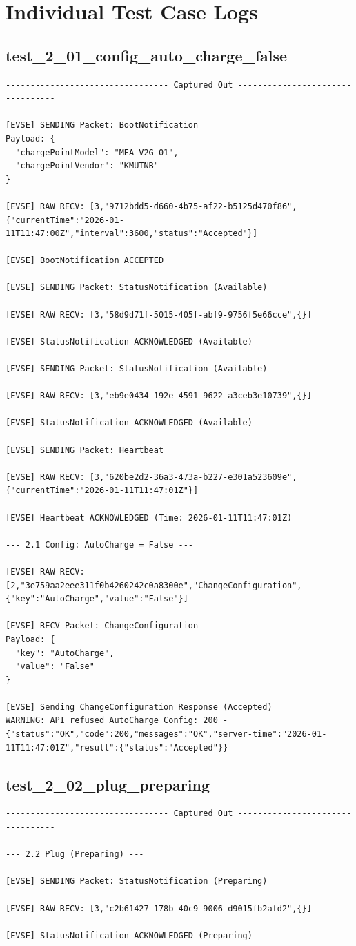 \documentclass{article}
\begin{document}
\section{Individual Test Case Logs}\subsection*{test\_2\_01\_config\_auto\_charge\_false}
\begin{lstlisting}
--------------------------------- Captured Out ---------------------------------

[EVSE] SENDING Packet: BootNotification
Payload: {
  "chargePointModel": "MEA-V2G-01",
  "chargePointVendor": "KMUTNB"
}

[EVSE] RAW RECV: [3,"9712bdd5-d660-4b75-af22-b5125d470f86",{"currentTime":"2026-01-11T11:47:00Z","interval":3600,"status":"Accepted"}]

[EVSE] BootNotification ACCEPTED

[EVSE] SENDING Packet: StatusNotification (Available)

[EVSE] RAW RECV: [3,"58d9d71f-5015-405f-abf9-9756f5e66cce",{}]

[EVSE] StatusNotification ACKNOWLEDGED (Available)

[EVSE] SENDING Packet: StatusNotification (Available)

[EVSE] RAW RECV: [3,"eb9e0434-192e-4591-9622-a3ceb3e10739",{}]

[EVSE] StatusNotification ACKNOWLEDGED (Available)

[EVSE] SENDING Packet: Heartbeat

[EVSE] RAW RECV: [3,"620be2d2-36a3-473a-b227-e301a523609e",{"currentTime":"2026-01-11T11:47:01Z"}]

[EVSE] Heartbeat ACKNOWLEDGED (Time: 2026-01-11T11:47:01Z)

--- 2.1 Config: AutoCharge = False ---

[EVSE] RAW RECV: [2,"3e759aa2eee311f0b4260242c0a8300e","ChangeConfiguration",{"key":"AutoCharge","value":"False"}]

[EVSE] RECV Packet: ChangeConfiguration
Payload: {
  "key": "AutoCharge",
  "value": "False"
}

[EVSE] Sending ChangeConfiguration Response (Accepted)
WARNING: API refused AutoCharge Config: 200 - {"status":"OK","code":200,"messages":"OK","server-time":"2026-01-11T11:47:01Z","result":{"status":"Accepted"}}
\end{lstlisting}
\subsection*{test\_2\_02\_plug\_preparing}
\begin{lstlisting}
--------------------------------- Captured Out ---------------------------------

--- 2.2 Plug (Preparing) ---

[EVSE] SENDING Packet: StatusNotification (Preparing)

[EVSE] RAW RECV: [3,"c2b61427-178b-40c9-9006-d9015fb2afd2",{}]

[EVSE] StatusNotification ACKNOWLEDGED (Preparing)
\end{lstlisting}
\end{document}
